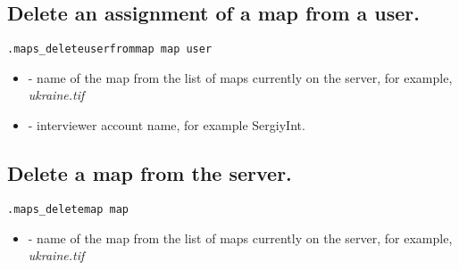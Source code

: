 \subsection{Delete an assignment of a map from a user.}
\begin{lstlisting}[style=CommandLineStyle]
.maps_deleteuserfrommap map user
\end{lstlisting}

\paramsheader
\begin{itemize}
  \item {} - name of the map from the list of maps currently on
        the server, for example, \textquotedbl \textit{ukraine.tif}\textquotedbl
  \item {} - interviewer account name, for example \textquotedbl
        SergiyInt\textquotedbl.
\end{itemize}


\subsection{Delete a map from the server.}
\begin{lstlisting}[style=CommandLineStyle]
.maps_deletemap map
\end{lstlisting}

\paramsheader
\begin{itemize}
  \item {} - name of the map from the list of maps currently on
  the server, for example, \textquotedbl \textit{ukraine.tif}\textquotedbl
\end{itemize}
